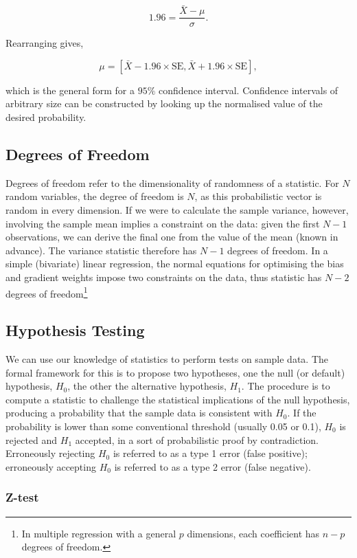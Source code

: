 \documentclass[11pt]{amsart}
\begin{document}
$$1.96 = \frac{\bar{X} - \mu}{\sigma}.$$

Rearranging gives,

$$\mu = [\bar{X} - 1.96\times\text{SE}, \bar{X} + 1.96\times\text{SE}],$$

which is the general form for a $95\%$ confidence interval. Confidence intervals of arbitrary size can be constructed by looking up the normalised value of the desired probability.

\subsection{Degrees of Freedom}

Degrees of freedom refer to the dimensionality of randomness of a statistic. For $N$ random variables, the degree of freedom is $N$, as this probabilistic vector is random in every dimension. If we were to calculate the sample variance, however, involving the sample mean implies a constraint on the data: given the first $N-1$ observations, we can derive the final one from the value of the mean (known in advance). The variance statistic therefore has $N-1$ degrees of freedom. In a simple (bivariate) linear regression, the normal equations for optimising the bias and gradient weights impose two constraints on the data, thus statistic has $N-2$ degrees of freedom\footnote{In multiple regression with a general $p$ dimensions, each coefficient has $n-p$ degrees of freedom.}

\subsection{Hypothesis Testing}

We can use our knowledge of statistics to perform tests on sample data. The formal framework for this is to propose two hypotheses, one the null (or default) hypothesis, $H_0$, the other the alternative hypothesis, $H_1$. The procedure is to compute a statistic to challenge the statistical implications of the null hypothesis, producing a probability that the sample data is consistent with $H_0$. If the probability is lower than some conventional threshold (usually 0.05 or 0.1), $H_0$ is rejected and $H_1$ accepted, in a sort of probabilistic proof by contradiction. Erroneously rejecting $H_0$ is referred to as a type 1 error (false positive); erroneously accepting $H_0$ is referred to as a type 2 error (false negative).

\subsubsection{Z-test}
\end{document}
